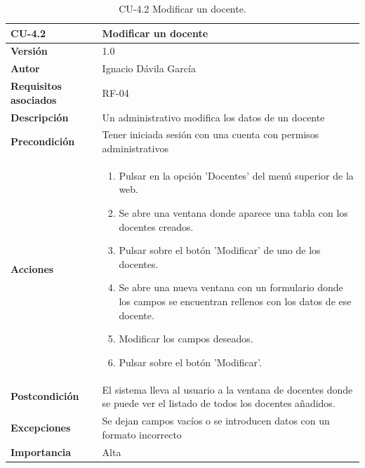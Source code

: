 \begin{table}[p]
	\centering
	\begin{tabularx}{\linewidth}{ p{} p{} }
		\toprule
		\textbf{CU-4.2}    & \textbf{Modificar un docente}\\
		\toprule
		\textbf{Versión}              & 1.0    \\
		\textbf{Autor}                & Ignacio Dávila García \\
		\textbf{Requisitos asociados} & RF-04 \\
		\textbf{Descripción}          & Un administrativo modifica los datos de un docente \\
		\textbf{Precondición}         & Tener iniciada sesión con una cuenta con permisos administrativos \\
		\textbf{Acciones}             &
		\begin{enumerate}
			\def\labelenumi{\arabic{enumi}.}
			\tightlist
			\item Pulsar en la opción 'Docentes' del menú superior de la web.
			\item Se abre una ventana donde aparece una tabla con los docentes creados.
			\item Pulsar sobre el botón 'Modificar' de uno de los docentes.
			\item Se abre una nueva ventana con un formulario donde los campos se encuentran rellenos con los datos de ese docente.
			\item Modificar los campos deseados.
			\item Pulsar sobre el botón 'Modificar'.
		\end{enumerate}\\
		\textbf{Postcondición}        & El sistema lleva al usuario a la ventana de docentes donde se puede ver el listado de todos los docentes añadidos. \\
		\textbf{Excepciones}          & Se dejan campos vacíos o se introducen datos con un formato incorrecto \\
		\textbf{Importancia}          & Alta \\
		\bottomrule
	\end{tabularx}
	\caption{CU-4.2 Modificar un docente.}
\end{table}

